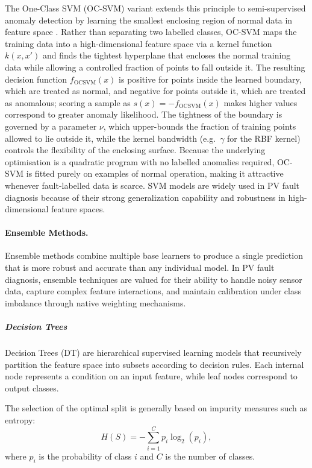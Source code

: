 The One-Class SVM (OC-SVM) variant extends this principle to semi-supervised anomaly detection by learning the smallest enclosing region of normal data in feature space \citep{scholkopf2001oneclass}. Rather than separating two labelled classes, OC-SVM maps the training data into a high-dimensional feature space via a kernel function $k(x,x')$ and finds the tightest hyperplane that encloses the normal training data while allowing a controlled fraction of points to fall outside it. The resulting decision function $f_{\text{OCSVM}}(x)$ is positive for points inside the learned boundary, which are treated as normal, and negative for points outside it, which are treated as anomalous; scoring a sample as $s(x)=-f_{\text{OCSVM}}(x)$ makes higher values correspond to greater anomaly likelihood. The tightness of the boundary is governed by a parameter $\nu$, which upper-bounds the fraction of training points allowed to lie outside it, while the kernel bandwidth (e.g.\ $\gamma$ for the RBF kernel) controls the flexibility of the enclosing surface. Because the underlying optimisation is a quadratic program with no labelled anomalies required, OC-SVM is fitted purely on examples of normal operation, making it attractive whenever fault-labelled data is scarce. SVM models are widely used in PV fault diagnosis because of their strong generalization capability and robustness in high-dimensional feature spaces.

\paragraph{Ensemble Methods.}
Ensemble methods combine multiple base learners to produce a single prediction that is more robust and accurate than any individual model. In PV fault diagnosis, ensemble techniques are valued for their ability to handle noisy sensor data, capture complex feature interactions, and maintain calibration under class imbalance through native weighting mechanisms.

\subparagraph{Decision Trees}

Decision Trees (DT) are hierarchical supervised learning models that recursively partition the feature space into subsets according to decision rules. Each internal node represents a condition on an input feature, while leaf nodes correspond to output classes.

The selection of the optimal split is generally based on impurity measures such as entropy:
\begin{equation}
H(S)=-\sum_{i=1}^{C}p_i\log_2(p_i),
\end{equation}
where $p_i$ is the probability of class $i$ and $C$ is the number of classes.

